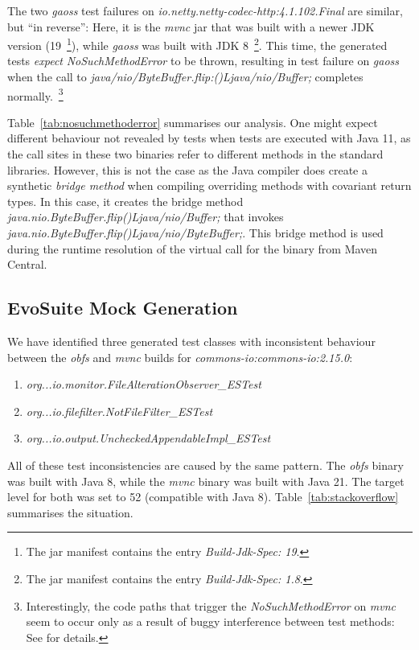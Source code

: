 \documentclass[conference]{IEEEtran}
\newcommand{\tim}[1]{\textbf{\textcolor{violet}{[ \ding{46}Tim: #1]}}}
\renewcommand{\tim}[1]{}
\begin{document}
The two \textit{gaoss} test failures on \textit{io.netty.netty-codec-http:4.1.102.Final} are similar, but ``in reverse'': Here, it is the \textit{mvnc} jar that was built with a newer JDK version (19~\footnote{The jar manifest contains the entry \textit{Build-Jdk-Spec: 19}.}), while \textit{gaoss} was built with JDK 8~\footnote{The jar manifest contains the entry \textit{Build-Jdk-Spec: 1.8}.}.
This time, the generated tests \textit{expect} \textit{NoSuchMethodError} to be thrown, resulting in test failure on \textit{gaoss} when the call to \textit{java/nio/ByteBuffer.flip:()Ljava/nio/Buffer;} completes normally.~\footnote{Interestingly, the code paths that trigger the \textit{NoSuchMethodError} on \textit{mvnc} seem to occur only as a result of buggy interference between test methods: See \tim{add URL to anonymised description page, or cut} for details.}

Table~\ref{tab:nosuchmethoderror} summarises our analysis. One might expect different behaviour not revealed by tests when tests are executed with Java 11, as the call sites in these two binaries refer to different methods in the standard libraries. However, this is not the case as the Java compiler does create a synthetic \textit{bridge method} when compiling overriding methods with covariant return types. In this case, it creates the bridge method \textit{java.nio.ByteBuffer.flip()Ljava/nio/Buffer;}  that invokes \textit{java.nio.ByteBuffer.flip()Ljava/nio/ByteBuffer;}. This bridge method is used during the  runtime resolution of the virtual call for the binary from Maven Central.  


\subsection{EvoSuite Mock Generation}


We have identified three generated test classes with inconsistent behaviour between the \textit{obfs} and \textit{mvnc} builds for \textit{commons-io:commons-io:2.15.0}: 
\begin{enumerate}
	\item  \textit{org...io.monitor.FileAlterationObserver\_ESTest}
    \item \textit{org...io.filefilter.NotFileFilter\_ESTest}
    \item  \textit{org...io.output.UncheckedAppendableImpl\_ESTest}
\end{enumerate}

All of these test inconsistencies are caused by the same pattern.  The \textit{obfs} binary was built  with Java 8, while the \textit{mvnc} binary was built with Java 21. The target level for both was set to 52 (compatible with Java 8). Table~\ref{tab:stackoverflow} summarises the situation.
\end{document}
